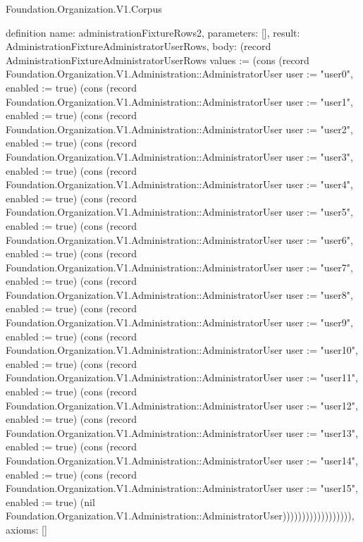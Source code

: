 \begin{lexlean}{Foundation.Organization.V1.Corpus}
\begin{semanticmodule}
definition{
  name: administrationFixtureRows2,
  parameters: [],
  result: AdministrationFixtureAdministratorUserRows,
  body: (record AdministrationFixtureAdministratorUserRows {values := (cons (record Foundation.Organization.V1.Administration::AdministratorUser {user := "user0", enabled := true}) (cons (record Foundation.Organization.V1.Administration::AdministratorUser {user := "user1", enabled := true}) (cons (record Foundation.Organization.V1.Administration::AdministratorUser {user := "user2", enabled := true}) (cons (record Foundation.Organization.V1.Administration::AdministratorUser {user := "user3", enabled := true}) (cons (record Foundation.Organization.V1.Administration::AdministratorUser {user := "user4", enabled := true}) (cons (record Foundation.Organization.V1.Administration::AdministratorUser {user := "user5", enabled := true}) (cons (record Foundation.Organization.V1.Administration::AdministratorUser {user := "user6", enabled := true}) (cons (record Foundation.Organization.V1.Administration::AdministratorUser {user := "user7", enabled := true}) (cons (record Foundation.Organization.V1.Administration::AdministratorUser {user := "user8", enabled := true}) (cons (record Foundation.Organization.V1.Administration::AdministratorUser {user := "user9", enabled := true}) (cons (record Foundation.Organization.V1.Administration::AdministratorUser {user := "user10", enabled := true}) (cons (record Foundation.Organization.V1.Administration::AdministratorUser {user := "user11", enabled := true}) (cons (record Foundation.Organization.V1.Administration::AdministratorUser {user := "user12", enabled := true}) (cons (record Foundation.Organization.V1.Administration::AdministratorUser {user := "user13", enabled := true}) (cons (record Foundation.Organization.V1.Administration::AdministratorUser {user := "user14", enabled := true}) (cons (record Foundation.Organization.V1.Administration::AdministratorUser {user := "user15", enabled := true}) (nil Foundation.Organization.V1.Administration::AdministratorUser)))))))))))))))))}),
  axioms: []
}


\end{semanticmodule}
\end{lexlean}
